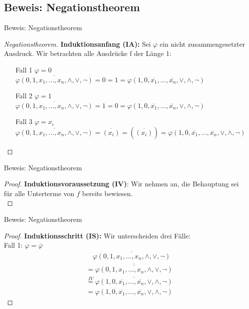 \documentclass[12pt%
,aspectratio=169%
]{beamer}
\begin{document}
\subsection{Beweis: Negationstheorem}
\begin{frame}{Beweis: Negationstheorem}
\begin{proof}[Negationstheorem]
\textbf{Induktionsanfang (IA):} Sei $\varphi$ ein nicht zusammengesetzter Ausdruck. Wir betrachten alle Ausdrücke f der Länge 1:
\begin{itemize}
	\item[Fall 1] $\varphi = 0$\\
	$\overline{\varphi(0, 1, x_1 , \ldots , x_n , \land, \lor, \neg)} = 0 = 1 = \varphi(1, 0, \overline{x_1} , \ldots ,\overline{x_n} , \lor, \land, \neg)$
	\item[Fall 2] $\varphi = 1$\\
	$\overline{\varphi(0, 1, x_1 , \ldots , x_n , \land, \lor, \neg)} = 1 = 0 = \varphi(1, 0, \overline{x_1} , \ldots ,\overline{x_n} , \lor, \land, \neg)$
	\item[Fall 3] $\varphi = x_i$\\
	$\overline{\varphi(0, 1, x_1 , \ldots , x_n , \land, \lor, \neg)} = \overline{(x_i)} = (\overline{(x_i)}) = \varphi(1, 0, \overline{x_1} , \ldots ,\overline{x_n} , \lor, \land, \neg)$
\end{itemize}
\end{proof}
\end{frame}

\begin{frame}{Beweis: Negationstheorem}
\begin{proof}
\textbf{Induktionsvoraussetzung (IV)}: Wir nehmen an, die Behauptung sei für
alle Unterterme von $f$ bereits bewiesen.\\
\end{proof}
\end{frame}

\begin{frame}{Beweis: Negationstheorem}
\begin{proof}
\textbf{Induktionsschritt (IS):} Wir unterscheiden drei Fälle:\\
Fall 1: $\varphi = \overline{\varphi}$
\begin{align*}
&\quad \overline{\varphi(0, 1, x_1 , \ldots , x_n , \land, \lor, \neg)}\\
&= \overline{\overline{\varphi(0, 1, x_1 , \ldots , x_n , \land, \lor, \neg)}}\\
&\overset{IV}= \overline{\varphi(1, 0, \overline{x_1} , \ldots ,\overline{x_n} , \lor, \land, \neg)}\\
&= \varphi(1, 0, \overline{x_1} , \ldots ,\overline{x_n} , \lor, \land, \neg)
\end{align*}
\end{proof}
\end{frame}
\end{document}
